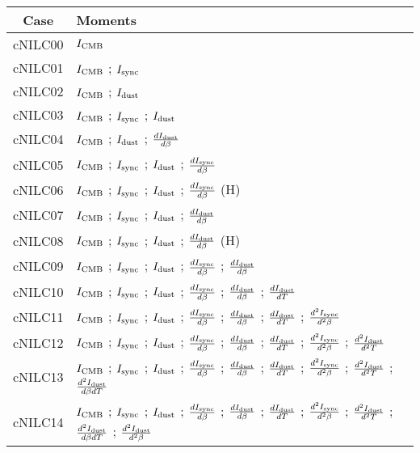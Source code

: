 \begin{tabular}{cl}
\toprule
    Case &                                                                                                                                                                                                                                                                                                         Moments \\
\midrule
 cNILC00 &  $I_{\rm CMB}$ \\
 cNILC01 &  $I_{\rm CMB}$ ; $I_{\rm sync}$ \\
 cNILC02 &  $I_{\rm CMB}$ ; $I_{\rm dust}$ \\
 cNILC03 &  $I_{\rm CMB}$ ; $I_{\rm sync}$ ; $I_{\rm dust}$ \\
 cNILC04 &  $I_{\rm CMB}$ ; $I_{\rm dust}$ ; $\frac{d I_{\rm dust}}{d \beta}$ \\
 cNILC05 &  $I_{\rm CMB}$ ; $I_{\rm sync}$ ; $I_{\rm dust}$ ; $\frac{d I_{\rm sync}}{d \beta}$ \\
 cNILC06 &  $I_{\rm CMB}$ ; $I_{\rm sync}$ ; $I_{\rm dust}$ ; $\frac{d I_{\rm sync}}{d \beta}$ (H) \\
 cNILC07 &  $I_{\rm CMB}$ ; $I_{\rm sync}$ ; $I_{\rm dust}$ ; $\frac{d I_{\rm dust}}{d \beta}$ \\
 cNILC08 &  $I_{\rm CMB}$ ; $I_{\rm sync}$ ; $I_{\rm dust}$ ; $\frac{d I_{\rm dust}}{d \beta}$ (H) \\
 cNILC09 &  $I_{\rm CMB}$ ; $I_{\rm sync}$ ; $I_{\rm dust}$ ; $\frac{d I_{\rm sync}}{d \beta}$ ; $\frac{d I_{\rm dust}}{d \beta}$ \\
 cNILC10 &  $I_{\rm CMB}$ ; $I_{\rm sync}$ ; $I_{\rm dust}$ ; $\frac{d I_{\rm sync}}{d \beta}$ ; $\frac{d I_{\rm dust}}{d \beta}$ ; $\frac{d I_{\rm dust}}{d T}$ \\
 cNILC11 &  $I_{\rm CMB}$ ; $I_{\rm sync}$ ; $I_{\rm dust}$ ; $\frac{d I_{\rm sync}}{d \beta}$ ; $\frac{d I_{\rm dust}}{d \beta}$ ; $\frac{d I_{\rm dust}}{d T}$ ; $\frac{d^2 I_{\rm sync}}{d^2 \beta}$ \\
 cNILC12 &  $I_{\rm CMB}$ ; $I_{\rm sync}$ ; $I_{\rm dust}$ ; $\frac{d I_{\rm sync}}{d \beta}$ ; $\frac{d I_{\rm dust}}{d \beta}$ ; $\frac{d I_{\rm dust}}{d T}$ ; $\frac{d^2 I_{\rm sync}}{d^2 \beta}$ ; $\frac{d^2 I_{\rm dust}}{d^2 T}$ \\
 cNILC13 &  $I_{\rm CMB}$ ; $I_{\rm sync}$ ; $I_{\rm dust}$ ; $\frac{d I_{\rm sync}}{d \beta}$ ; $\frac{d I_{\rm dust}}{d \beta}$ ; $\frac{d I_{\rm dust}}{d T}$ ; $\frac{d^2 I_{\rm sync}}{d^2 \beta}$ ; $\frac{d^2 I_{\rm dust}}{d^2 T}$ ; $\frac{d^2 I_{\rm dust}}{d \beta d T}$ \\
 cNILC14 &  $I_{\rm CMB}$ ; $I_{\rm sync}$ ; $I_{\rm dust}$ ; $\frac{d I_{\rm sync}}{d \beta}$ ; $\frac{d I_{\rm dust}}{d \beta}$ ; $\frac{d I_{\rm dust}}{d T}$ ; $\frac{d^2 I_{\rm sync}}{d^2 \beta}$ ; $\frac{d^2 I_{\rm dust}}{d^2 T}$ ; $\frac{d^2 I_{\rm dust}}{d \beta d T}$ ; $\frac{d^2 I_{\rm dust}}{d^2 \beta}$ \\
\bottomrule
\end{tabular}
